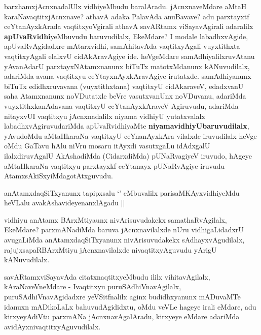 \begin{center}


\end{center}

\begin{artha}
barxhamxjAcnxnadalUlx vidhiyeMbudu baralAradu. jAcnxnaveMdare aMtaH
karaNavaqtitxjAcnxnave? athavA adaka PalavAda anuBavave? adu
parxtayxtf ceYtanAyxkArada vaqtitxyoVgirali athavA savARtamx
viSayavAgirali adaralilx \textbf{apUvaRvidhi}yeMbuvudu baruvudilalx,
EkeMdare? I modale labadhxvAgide, apUvaRvAgidadxre mAtarxvidhi,
samAhitavAda vaqtitxyAgali vuyxtithxta vaqtitxyAgali elalxvU
cidAkAravAgiye ide. heVgeMdare samAdhiyalilxruvAtanu yAvanAdarU
parxtayxNAtamxnanunx biTuTx matotxMdanunx kANuvudilalx, adariMda avana
vaqtitxyu ceYtayxnAyxkAravAgiye irutatxde. samAdhiyanunx biTuTx
edidhxruvavana (vuyxtithxtana) vaqtitxyU cidAkaraveV, edadxvanU saha
Atamxnanunx noVDutatxle beVre vasutxvanUnx noVDuvanu, adariMda
vuyxtithxkanAdavana vaqtitxyU ceYtanAyxkAraveV Agiruvudu, adariMda
nitayxvUI vaqtitxyu  jAcnxnadalilx niyama vidhiyU yutatxvalalx
labadhxvAgiruvudariMda apUvaRvidhiyaMte
\textbf{niyamavidhiyUbaruvudilalx}, yAvudoMdu aMtaHkaraNa vaqtitxyU
ceYnanAyxkAra vilalxde iruvudilalx heVge oMdu GaTavu hAlu niVru mosaru
itAyxdi vasutxgaLu idAdxgalU ilalxdiruvAgalU AkAshadiMda (CidarxdiMda)
pUNaRvagiyeV iruvudo, hAgeye aMtaHkaraNa vaqtitxyu parxtayxkf
ceYtanayx pUNaRvAgiye iruvudu AtamxsAkiSxyiMdagotAtxguvudu.
\end{artha}

\begin{center}


\end{center}

\begin{artha}
anAtamxdaqSiTxyanunx tapipxsalu `\stext' eMbuvalilx
parisaMKAyxvidhiyeMdu heVLalu avakAshavideyenanxlAgadu ||

vidhiyu anAtamx BArxMtiyaunx nivArisuvudakekx samathaRvAgilalx,
EkeMdare? parxmANadiMda baruva jAcnxnavilalxde nUru vidhigaLidadxrU
avugaLiMda anAtamxdaqSiTxyanunx nivArisuvudakekx sAdhayxvAgudilalx,
rajujxsapaRBArxMtiyu jAcnxnavilalxde nivaqtitxyAguvudu yArigU kANuvudilalx.
\end{artha}

\begin{artha}
savARtamxviSayavAda citatxnaqtitxyeMbudu ililx vihitavAgilalx,
kAraNaveVneMdare - Ivaqtitxyu puruSAdhiVnavAgilalx,
puruSAdhiVnavAgidadxre yeVSitfnalilx aginx budidhxyanunx mADuvaMTe
idanuxn mADikoLaLx bahuvudAgididxtu, oMdu veVLe hageye irali eMdare,
adu kirxyeyAdiVtu parxmANa jAcnxnavAgalAradu, kirxyeye eMdare adariMda avidAyxnivaqtitxyAguvudilalx.
\end{artha}

